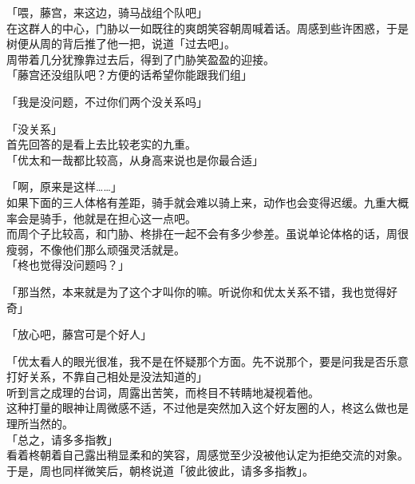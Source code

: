 「喂，藤宫，来这边，骑马战组个队吧」\\

在这群人的中心，门胁以一如既往的爽朗笑容朝周喊着话。周感到些许困惑，于是树便从周的背后推了他一把，说道「过去吧」。\\

周带着几分犹豫靠过去后，得到了门胁笑盈盈的迎接。\\

「藤宫还没组队吧？方便的话希望你能跟我们组」

「我是没问题，不过你们两个没关系吗」

「没关系」\\

首先回答的是看上去比较老实的九重。\\

「优太和一哉都比较高，从身高来说也是你最合适」

「啊，原来是这样……」\\

如果下面的三人体格有差距，骑手就会难以骑上来，动作也会变得迟缓。九重大概率会是骑手，他就是在担心这一点吧。\\

而周个子比较高，和门胁、柊排在一起不会有多少参差。虽说单论体格的话，周很瘦弱，不像他们那么顽强灵活就是。\\

「柊也觉得没问题吗？」

「那当然，本来就是为了这个才叫你的嘛。听说你和优太关系不错，我也觉得好奇」

「放心吧，藤宫可是个好人」

「优太看人的眼光很准，我不是在怀疑那个方面。先不说那个，要是问我是否乐意打好关系，不靠自己相处是没法知道的」\\

听到言之成理的台词，周露出苦笑，而柊目不转睛地凝视着他。\\

这种打量的眼神让周微感不适，不过他是突然加入这个好友圈的人，柊这么做也是理所当然的。\\

「总之，请多多指教」\\

看着柊朝着自己露出稍显柔和的笑容，周感觉至少没被他认定为拒绝交流的对象。于是，周也同样微笑后，朝柊说道「彼此彼此，请多多指教」。
